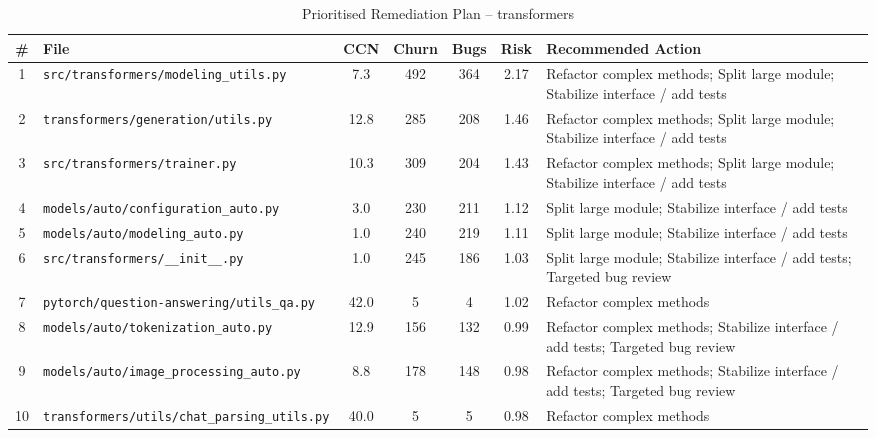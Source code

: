 \begin{table}[H]
\centering
\footnotesize
\caption{Prioritised Remediation Plan -- transformers}
\label{tab:remediation_transformers}
\begin{tabular}{c l c c c c p{4.2cm}}
\toprule
\# & File & CCN & Churn & Bugs & Risk & Recommended Action \\
\midrule
  1 & \texttt{src/transformers/modeling\_utils.py} & 7.3 & 492 & 364 & 2.17 & Refactor complex methods; Split large module; Stabilize interface / add tests \\
  2 & \texttt{transformers/generation/utils.py} & 12.8 & 285 & 208 & 1.46 & Refactor complex methods; Split large module; Stabilize interface / add tests \\
  3 & \texttt{src/transformers/trainer.py} & 10.3 & 309 & 204 & 1.43 & Refactor complex methods; Split large module; Stabilize interface / add tests \\
  4 & \texttt{models/auto/configuration\_auto.py} & 3.0 & 230 & 211 & 1.12 & Split large module; Stabilize interface / add tests \\
  5 & \texttt{models/auto/modeling\_auto.py} & 1.0 & 240 & 219 & 1.11 & Split large module; Stabilize interface / add tests \\
  6 & \texttt{src/transformers/\_\_init\_\_.py} & 1.0 & 245 & 186 & 1.03 & Split large module; Stabilize interface / add tests; Targeted bug review \\
  7 & \texttt{pytorch/question-answering/utils\_qa.py} & 42.0 & 5 & 4 & 1.02 & Refactor complex methods \\
  8 & \texttt{models/auto/tokenization\_auto.py} & 12.9 & 156 & 132 & 0.99 & Refactor complex methods; Stabilize interface / add tests; Targeted bug review \\
  9 & \texttt{models/auto/image\_processing\_auto.py} & 8.8 & 178 & 148 & 0.98 & Refactor complex methods; Stabilize interface / add tests; Targeted bug review \\
  10 & \texttt{transformers/utils/chat\_parsing\_utils.py} & 40.0 & 5 & 5 & 0.98 & Refactor complex methods \\
\bottomrule
\end{tabular}
\end{table}
